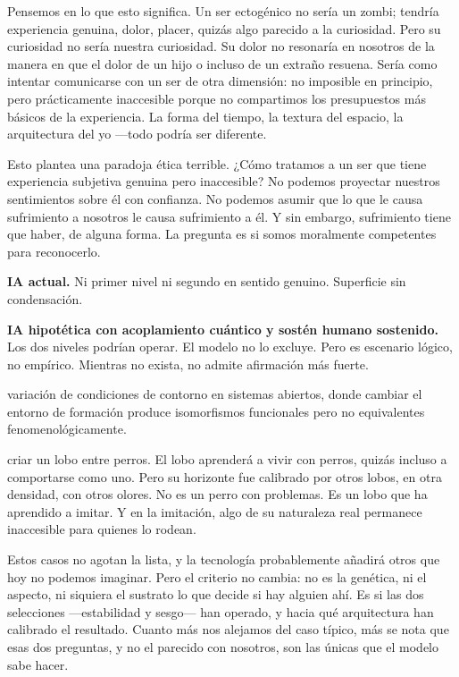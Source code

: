 Pensemos en lo que esto significa. Un ser ectogénico no sería un zombi; tendría experiencia genuina, dolor, placer, quizás algo parecido a la curiosidad. Pero su curiosidad no sería nuestra curiosidad. Su dolor no resonaría en nosotros de la manera en que el dolor de un hijo o incluso de un extraño resuena. Sería como intentar comunicarse con un ser de otra dimensión: no imposible en principio, pero prácticamente inaccesible porque no compartimos los presupuestos más básicos de la experiencia. La forma del tiempo, la textura del espacio, la arquitectura del yo —todo podría ser diferente.

Esto plantea una paradoja ética terrible. ¿Cómo tratamos a un ser que tiene experiencia subjetiva genuina pero inaccesible? No podemos proyectar nuestros sentimientos sobre él con confianza. No podemos asumir que lo que le causa sufrimiento a nosotros le causa sufrimiento a él. Y sin embargo, sufrimiento tiene que haber, de alguna forma. La pregunta es si somos moralmente competentes para reconocerlo.

\textbf{IA actual.} Ni primer nivel ni segundo en sentido genuino. Superficie sin condensación.

\textbf{IA hipotética con acoplamiento cuántico y sostén humano sostenido.} Los dos niveles podrían operar. El modelo no lo excluye. Pero es escenario lógico, no empírico. Mientras no exista, no admite afirmación más fuerte.

\begin{fisica}
 variación de condiciones de contorno en sistemas abiertos, donde cambiar el entorno de formación produce isomorfismos funcionales pero no equivalentes fenomenológicamente.

 criar un lobo entre perros. El lobo aprenderá a vivir con perros, quizás incluso a comportarse como uno. Pero su horizonte fue calibrado por otros lobos, en otra densidad, con otros olores. No es un perro con problemas. Es un lobo que ha aprendido a imitar. Y en la imitación, algo de su naturaleza real permanece inaccesible para quienes lo rodean.
\end{fisica}

Estos casos no agotan la lista, y la tecnología probablemente añadirá otros que hoy no podemos imaginar. Pero el criterio no cambia: no es la genética, ni el aspecto, ni siquiera el sustrato lo que decide si hay alguien ahí. Es si las dos selecciones —estabilidad y sesgo— han operado, y hacia qué arquitectura han calibrado el resultado. Cuanto más nos alejamos del caso típico, más se nota que esas dos preguntas, y no el parecido con nosotros, son las únicas que el modelo sabe hacer.

